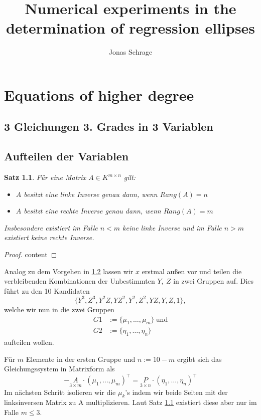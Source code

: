 \documentclass[a4paper,twoside, 11pt]{book}
\author{Jonas Schrage}
\title{Numerical experiments in the determination of regression ellipses}
\date{}
\newcommand{\coloneqq}{:=}
\theoremstyle{custom}
\newtheorem{proposition}[theorem]{Satz}
\theoremstyle{custom}
\begin{document}
	
	\maketitle
	\newpage
	\tableofcontents
	\newpage
	\chapter{Equations of higher degree}
	\section{3 Gleichungen 3. Grades in 3 Variablen}
	\newpage
	\section{Aufteilen der Variablen}
	\begin{proposition}\label{prop:gen_inv}
		Für eine Matrix $A \in K^{m\times n}$ gilt:
		\begin{itemize}
			 \item[$-$] $A$ besitzt eine linke Inverse genau dann, wenn $Rang(A) = n$
			 \item[$-$] $A$ besitzt eine rechte Inverse genau dann, wenn $Rang(A) = m$
		\end{itemize}
		Insbesondere existiert im Falle $n<m$ keine linke Inverse und im Falle $n>m$ existiert keine rechte Inverse.
	\end{proposition}

	\begin{proof}
		content
	\end{proof}

	Analog zu dem Vorgehen in \ref{} lassen wir $x$ erstmal außen vor und teilen die verbleibenden Kombinationen der Unbestimmten $Y,\ Z$ in zwei Gruppen auf.
	Dies führt zu den 10 Kandidaten 
	\begin{equation}
		\{Y^3,Z^3,Y^2Z,YZ^2,Y^2,Z^2,YZ,Y,Z,1\},
	\end{equation}
	welche wir nun in die zwei Gruppen 
	\begin{align}
		G1 &\coloneqq \{\mu_1,\ldots,\mu_m\} \ \text{und} \\
		G2 &\coloneqq \{\eta_1,\ldots,\eta_n\}
	\end{align}
	aufteilen wollen.
	
	Für $m$ Elemente in der ersten Gruppe und $n \coloneqq 10-m$ ergibt sich das Gleichungssystem in Matrixform als
	\begin{equation}
		-\underset{\scriptscriptstyle 3\times m}{A} \cdot \left(\mu_1,\ldots,\mu_m\right)^{\intercal} = \underset{\scriptscriptstyle 3\times n}{P} \cdot \left(\eta_1,\ldots,\eta_n\right)^{\intercal}
	\end{equation}
	Im nächsten Schritt isolieren wir die $\mu_k$'s indem wir beide Seiten mit der linksinversen Matrix zu A multiplizieren. Laut Satz \ref{prop:gen_inv} existiert diese aber nur im Falle $m \leq 3$.
	
\end{document}
